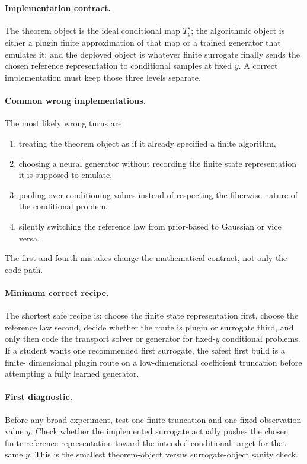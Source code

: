 \documentclass[11pt]{report}
\begin{document}
\paragraph{Implementation contract.}
The theorem object is the ideal conditional map $T_y^\star$; the algorithmic object is
either a plugin finite approximation of that map or a trained generator that emulates
it; and the deployed object is whatever finite surrogate finally sends the chosen
reference representation to conditional samples at fixed $y$.  A correct implementation
must keep those three levels separate.

\paragraph{Common wrong implementations.}
The most likely wrong turns are:
\begin{enumerate}[label=(\roman*)]
  \item treating the theorem object as if it already specified a finite algorithm,
  \item choosing a neural generator without recording the finite state representation it is supposed to emulate,
  \item pooling over conditioning values instead of respecting the fiberwise nature of the conditional problem,
  \item silently switching the reference law from prior-based to Gaussian or vice versa.
\end{enumerate}
The first and fourth mistakes change the mathematical contract, not only the code path.

\paragraph{Minimum correct recipe.}
The shortest safe recipe is: choose the finite state representation first, choose the
reference law second, decide whether the route is plugin or surrogate third, and only
then code the transport solver or generator for fixed-$y$ conditional problems.  If a
student wants one recommended first surrogate, the safest first build is a finite-
dimensional plugin route on a low-dimensional coefficient truncation before attempting
a fully learned generator.

\paragraph{First diagnostic.}
Before any broad experiment, test one finite truncation and one fixed observation value
$y$.  Check whether the implemented surrogate actually pushes the chosen finite
reference representation toward the intended conditional target for that same $y$.
This is the smallest theorem-object versus surrogate-object sanity check.
\end{document}
